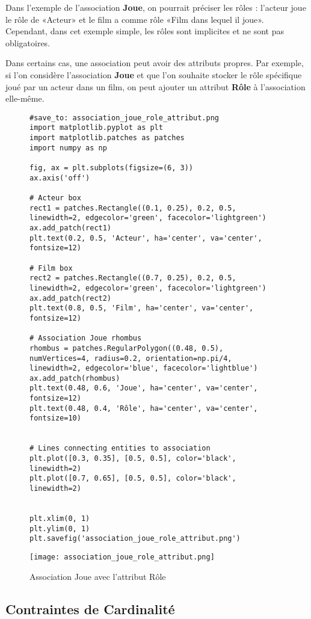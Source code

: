 \documentclass{article}
\begin{document}
Dans l'exemple de l'association \textbf{Joue}, on pourrait préciser les rôles : l'acteur joue le rôle de «Acteur» et le film a comme rôle «Film dans lequel il joue».  Cependant, dans cet exemple simple, les rôles sont implicites et ne sont pas obligatoires.

Dans certains cas, une association peut avoir des attributs propres.  Par exemple, si l'on considère l'association \textbf{Joue} et que l'on souhaite stocker le rôle spécifique joué par un acteur dans un film, on peut ajouter un attribut \textbf{Rôle} à l'association elle-même.


\begin{figure}[H]
    \centering
    \begin{verbatim}
#save_to: association_joue_role_attribut.png
import matplotlib.pyplot as plt
import matplotlib.patches as patches
import numpy as np

fig, ax = plt.subplots(figsize=(6, 3))
ax.axis('off')

# Acteur box
rect1 = patches.Rectangle((0.1, 0.25), 0.2, 0.5, linewidth=2, edgecolor='green', facecolor='lightgreen')
ax.add_patch(rect1)
plt.text(0.2, 0.5, 'Acteur', ha='center', va='center', fontsize=12)

# Film box
rect2 = patches.Rectangle((0.7, 0.25), 0.2, 0.5, linewidth=2, edgecolor='green', facecolor='lightgreen')
ax.add_patch(rect2)
plt.text(0.8, 0.5, 'Film', ha='center', va='center', fontsize=12)

# Association Joue rhombus
rhombus = patches.RegularPolygon((0.48, 0.5), numVertices=4, radius=0.2, orientation=np.pi/4, linewidth=2, edgecolor='blue', facecolor='lightblue')
ax.add_patch(rhombus)
plt.text(0.48, 0.6, 'Joue', ha='center', va='center', fontsize=12)
plt.text(0.48, 0.4, 'Rôle', ha='center', va='center', fontsize=10)


# Lines connecting entities to association
plt.plot([0.3, 0.35], [0.5, 0.5], color='black', linewidth=2)
plt.plot([0.7, 0.65], [0.5, 0.5], color='black', linewidth=2)


plt.xlim(0, 1)
plt.ylim(0, 1)
plt.savefig('association_joue_role_attribut.png')

        \end{verbatim}
        \texttt{[image: association\_joue\_role\_attribut.png]}
        \caption{Association Joue avec l'attribut Rôle}
        \label{fig:association_joue_role_attribut}
    \end{figure}


\subsection{Contraintes de Cardinalité}
\end{document}
